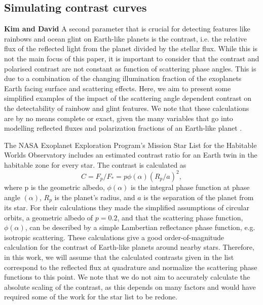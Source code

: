 \documentclass[
    usenatbib,
]{mnras}
\begin{document}
\subsection{Simulating contrast curves}
\textbf{Kim and David}
%
A second parameter that is crucial for detecting features like rainbows and ocean glint on Earth-like planets is the contrast, i.e. the relative flux of the reflected light from the planet divided by the stellar flux. 
%
While this is not the main focus of this paper, it is important to consider that the contrast and polarised contrast are not constant as function of scattering phase angles.
%
This is due to a combination of the changing illumination fraction of the exoplanets Earth facing surface and scattering effects.
%
Here, we aim to present some simplified examples of the impact of the scattering angle dependent contrast on the detectability of rainbow and glint features. 
%
We note that these calculations are by no means complete or exact, given the many variables that go into modelling reflected fluxes and polarization fractions of an Earth-like planet \citep{ treesstam2019,trees2022}.


The NASA Exoplanet Exploration Program’s Mission Star List for the Habitable Worlds Observatory includes an estimated contrast ratio for an Earth twin in the habitable zone for every star. 
%
The contrast is calculated as 
\begin{equation}
C = F_p/F_* = p \phi (\alpha) (R_p/a)^2,
\end{equation}
where p is the geometric albedo, $\phi (\alpha)$ is the integral phase function at phase angle $(\alpha)$, $R_p$ is the planet’s radius, and $a$ is the separation of the planet from its star. 
%
For their calculations they made the simplified assumptions of circular orbits, a geometric albedo of $p=0.2$, and that the scattering phase function, $\phi (\alpha)$, can be described by a simple Lambertian reflectance phase function, e.g. isotropic scattering.
%
These calculations give a good order-of-magnitude calculation for the contrast of Earth-like planets around nearby stars.
%
Therefore, in this work, we will assume that the calculated contrasts given in the list correspond to the reflected flux at quadrature and normalize the scattering phase functions to this point.
%
We note that we do not aim to accurately calculate the absolute scaling of the contrast, as this depends on many factors and would have required some of the work for the star list to be redone.
\end{document}
